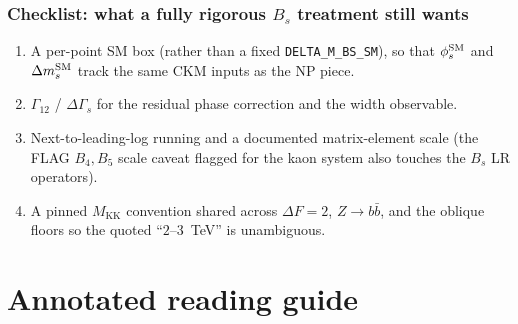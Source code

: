 \documentclass[11pt]{article}
\newcommand{\MKK}{M_{\mathrm{KK}}}
\newcommand{\code}[1]{\texttt{#1}}
\newcommand{\Bs}{B_s}
\newcommand{\dms}{\Delta m_s}
\newcommand{\phis}{\phi_s}
\theoremstyle{definition}
\begin{document}
\section{Checklist: what a fully rigorous $\Bs$ treatment still wants}
\begin{enumerate}[leftmargin=1.8em]
\item A per-point SM box (rather than a fixed \code{DELTA\_M\_BS\_SM}), so that
$\phis^{\rm SM}$ and $\dms^{\rm SM}$ track the same CKM inputs as the NP piece.
\item $\Gamma_{12}$ / $\Delta\Gamma_s$ for the residual phase correction and the
width observable.
\item Next-to-leading-log running and a documented matrix-element scale
(the FLAG $B_4,B_5$ scale caveat flagged for the kaon system also touches the
$\Bs$ LR operators).
\item A pinned $\MKK$ convention shared across $\Delta F=2$, $Z\to b\bar b$, and
the oblique floors so the quoted ``$2$--$3$~TeV'' is unambiguous.
\end{enumerate}

\part*{Annotated reading guide}
\end{document}
